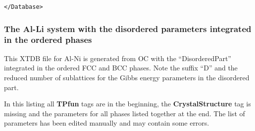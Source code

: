 \documentclass{article}
\begin{document}
\begin{appendices}
\begin{verbatim}
</Database>
\end{verbatim}

\subsubsection{The Al-Li system with the disordered parameters
  integrated in the ordered phases}\label{sec:alli2}

This XTDB file for Al-Ni is generated from OC with the
``DisorderedPart'' integrated in the ordered FCC and BCC phases.  Note
the suffix ``D'' and the reduced number of sublattices for the Gibbs
energy parameters in the disordered part.

In this listing all {\bf TPfun} tags are in the beginning, the {\bf
  CrystalStructure} tag is missing and the parameters for all phases
listed together at the end.  The list of parameters has been edited
manually and may contain some errors.


\end{appendices}
\end{document}
